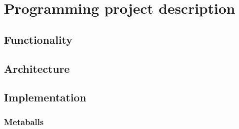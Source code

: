 \chapter{Programming project description}
\label{chap:project}
\section{Functionality}
\section{Architecture}
\section{Implementation}
\subsection{Metaballs}
